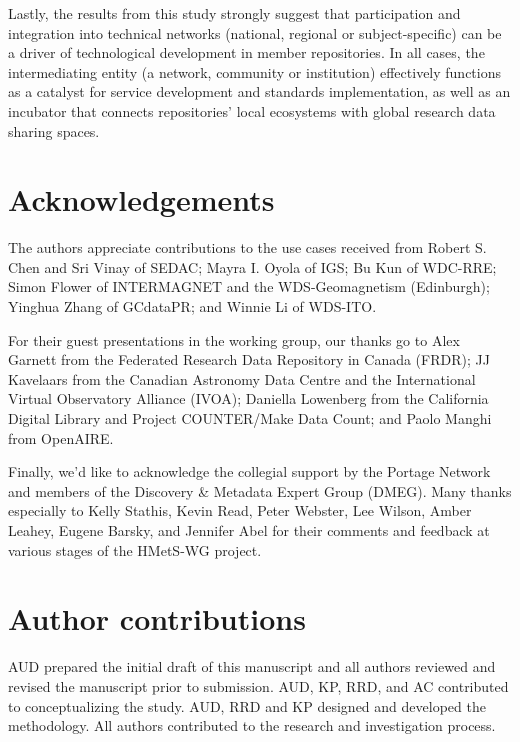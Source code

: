 \documentclass{interact}
\begin{document}
Lastly, the results from this study strongly suggest that participation and integration into technical networks (national, regional or subject-specific) can be a driver of technological development in member repositories. In all cases, the intermediating entity (a network, community or institution) effectively functions as a catalyst for service development and standards implementation, as well as an incubator that connects repositories' local ecosystems with global research data sharing spaces.

\section*{Acknowledgements}\label{acknowledgment}
The authors appreciate contributions to the use cases received from Robert S. Chen and Sri Vinay of SEDAC; Mayra I. Oyola of IGS; Bu Kun of WDC-RRE; Simon Flower of INTERMAGNET and the WDS-Geomagnetism (Edinburgh); Yinghua Zhang of GCdataPR; and Winnie Li of WDS-ITO.

For their guest presentations in the working group, our thanks go to Alex Garnett from the Federated Research Data Repository in Canada (FRDR); JJ Kavelaars from the Canadian Astronomy Data Centre and the International Virtual Observatory Alliance (IVOA); Daniella Lowenberg from the California Digital Library and Project COUNTER/Make Data Count; and Paolo Manghi from OpenAIRE.

Finally, we'd like to acknowledge the collegial support by the Portage Network and members of the Discovery \& Metadata Expert Group (DMEG). Many thanks especially to Kelly Stathis, Kevin Read, Peter Webster, Lee Wilson, Amber Leahey, Eugene Barsky, and Jennifer Abel for their comments and feedback at various stages of the HMetS-WG project.

\section*{Author contributions}\label{author-disclosure}
AUD prepared the initial draft of this manuscript and all authors reviewed and revised the manuscript prior to submission. AUD, KP, RRD, and AC contributed to conceptualizing the study. AUD, RRD and KP designed and developed the methodology. All authors contributed to the research and investigation process.
\end{document}
